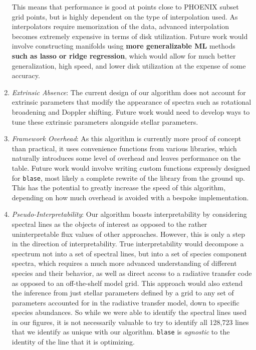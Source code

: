 \documentclass[twocolumn, linenumbers]{aastex631}
\begin{document}
\begin{enumerate}[label=-]
    This means that performance is good at points close to PHOENIX subset grid points, but is highly dependent on the type of interpolation used.
    As interpolators require memorization of the data, advanced interpolation becomes extremely expensive in terms of disk utilization.
    Future work would involve constructing manifolds using \textbf{more generalizable ML} methods \textbf{such as lasso or ridge regression}, which would allow for much better generalization, high speed, and lower disk utilization at the expense of some accuracy.
    \item \textit{Extrinsic Absence}: The current design of our algorithm does not account for extrinsic parameters that modify the appearance of spectra such as rotational broadening and Doppler shifting.
    Future work would need to develop ways to tune these extrinsic parameters alongside stellar parameters.
    \item \textit{Framework Overhead}: As this algorithm is currently more proof of concept than practical, it uses convenience functions from various libraries, which naturally introduces some level of overhead and leaves performance on the table.
    Future work would involve writing custom functions expressly designed for \texttt{blase}, most likely a complete rewrite of the library from the ground up.
    This has the potential to greatly increase the speed of this algorithm, depending on how much overhead is avoided with a bespoke implementation.
    \item \textit{Pseudo-Interpretability}: Our algorithm boasts interpretability by considering spectral lines as the objects of interest as opposed to the rather uninterpretable flux values of other approaches.
    However, this is only a step in the direction of interpretability.
    True interpretability would decompose a spectrum not into a set of spectral lines, but into a set of species component spectra, which requires a much more advanced understanding of different species and their behavior, as well as direct access to a radiative transfer code as opposed to an off-the-shelf model grid.
    This approach would also extend the inference from just stellar parameters defined by a grid to any set of parameters accounted for in the radiative transfer model, down to specific species abundances.
    So while we were able to identify the spectral lines used in our figures, it is not necessarily valuable to try to identify all 128,723 lines that we identify as unique with our algorithm.
    \texttt{blase} is \textit{agnostic} to the identity of the line that it is optimizing.

\end{enumerate}
\end{document}
